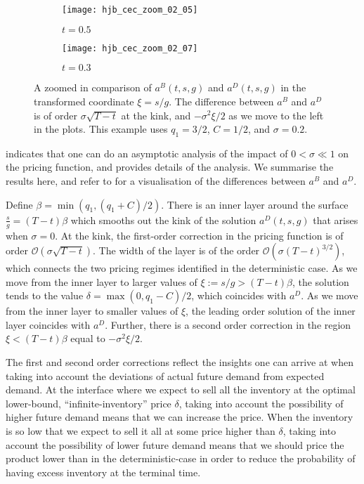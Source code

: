 \documentclass[main.tex]{subfiles}
\begin{document}
\begin{figure}[hbt]
  \centering
  \begin{subfigure}[b]{0.5\textwidth}
    \texttt{[image: hjb\_cec\_zoom\_02\_05]}
    \caption{$t = 0.5$}
  \end{subfigure}%
  \begin{subfigure}[b]{0.5\textwidth}
    \texttt{[image: hjb\_cec\_zoom\_02\_07]}
    \caption{$t=0.3$}
  \end{subfigure}
  \caption{A zoomed in comparison of $a^B(t,s,g)$ and $a^D(t,s,g)$
    in the transformed coordinate $\xi=s/g$.
    The difference between $a^B$ and $a^D$ is of order
    $\sigma\sqrt{T-t}$ at the kink, and
    $-\sigma^2\xi/2$ as we move to the left in the
    plots.
    This example uses $q_1=3/2$, $C=1/2$, and $\sigma=0.2$.
  }\label{fig:hjb_cec_zoom}
\end{figure}
 indicates that one can do an asymptotic analysis
of the impact of $0<\sigma \ll 1$ on the pricing
function, and  provides details of the
analysis. We summarise the
results here, and refer to  for a visualisation
of the differences between $a^B$ and $a^D$.
\begin{myresult}\label{res:linear_asymptotics}
  Define $\beta=\min(q_1,(q_1+C)/2)$.
  There is an inner layer around the surface $\frac{s}{g}=(T-t)\beta$ which
  smooths out the kink of the solution $a^D(t,s,g)$ that arises when
  $\sigma=0$. At the kink, the first-order correction in the pricing
  function is of order $\mathcal{O}(\sigma\sqrt{T-t})$.
  The width of the layer is of the order
  $\mathcal{O}(\sigma{(T-t)}^{3/2})$, which connects the two pricing
  regimes identified in the deterministic case.
  As we move from the inner layer to larger values of
  $\xi:=s/g>(T-t)\beta$, the solution
  tends to the value $\delta=\max(0,q_1-C)/2$, which coincides with
  $a^D$. As we move from the inner layer to smaller values of $\xi$,
  the leading order solution of the inner layer coincides with $a^D$.
  Further, there is a second order correction in the region
  $\xi<(T-t)\beta$ equal to $-\sigma^2 \xi/2$.
\end{myresult}

The first and second order corrections reflect the insights one can
arrive at when taking into account the deviations of actual future
demand from expected demand.
At the interface where we expect to sell all the inventory at the
optimal lower-bound, ``infinite-inventory'' price $\delta$, taking
into account the possibility of higher future demand means that we can
increase the price.
When the inventory is so low that we expect to sell it all at some
price higher than $\delta$, taking into account the possibility
of lower future demand means that we should price the product lower than in the
deterministic-case in order to
reduce the probability of having excess inventory at the terminal time.
\end{document}
